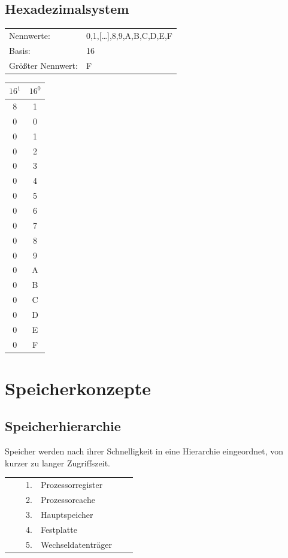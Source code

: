 \documentclass[12pt,a4paper]{article}
\begin{document}
\begin{minipage}{.49\textwidth}
\vspace{0.5cm}
\subsection{Hexadezimalsystem}
\begin{tabularx}{9cm}{XX}
Nennwerte:&0,1,[\dots],8,9,A,B,C,D,E,F\\
Basis:&16\\
Größter Nennwert:&F\\
\end{tabularx}
\begin{center}
    \begin{tabular}{|c|c|}
        \hline

        $16^1$ & $16^0$ \\
        \hline
        8     & 1      \\
        \hline
        \hline
        0      & 0      \\
        0      & 1      \\
        0      & 2      \\
        0      & 3      \\
        0      & 4      \\
        0      & 5      \\
        0      & 6      \\
        0      & 7      \\
         0     & 8     \\
        0     & 9      \\
        0      & A      \\
        0      & B      \\
        0      & C      \\
        0      & D      \\
        0      & E      \\
        0      & F      \\
        \hline
    \end{tabular}
\end{center}
\end{minipage}
\section{Speicherkonzepte}
\subsection{Speicherhierarchie}
Speicher werden nach ihrer Schnelligkeit in eine Hierarchie eingeordnet, von kurzer zu langer Zugriffszeit.
\begin{center}
\begin{tabularx}{13cm}{XXXlXX}
&&1.& Prozessorregister&&\\
&&2.& Prozessorcache&&\\
&&3.& Hauptspeicher&&\\
&&4.& Festplatte&&\\
&&5.& Wechseldatenträger&&\\
\end{tabularx}
\end{center}
\end{document}
